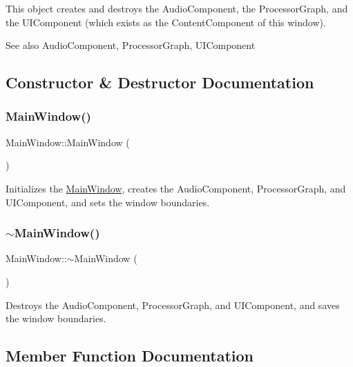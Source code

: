 This object creates and destroys the Audio\+Component, the Processor\+Graph, and the U\+I\+Component (which exists as the Content\+Component of this window).

\begin{DoxySeeAlso}{See also}
Audio\+Component, Processor\+Graph, U\+I\+Component 
\end{DoxySeeAlso}


\subsection{Constructor \& Destructor Documentation}
\mbox{\label{class_main_window_a34c4b4207b46d11a4100c9b19f0e81bb}} 
\subsubsection{\texorpdfstring{Main\+Window()}{MainWindow()}}
{\footnotesize\ttfamily Main\+Window\+::\+Main\+Window (\begin{DoxyParamCaption}{ }\end{DoxyParamCaption})}

Initializes the \mbox{\hyperlink{class_main_window}{Main\+Window}}, creates the Audio\+Component, Processor\+Graph, and U\+I\+Component, and sets the window boundaries. \mbox{\label{class_main_window_ae98d00a93bc118200eeef9f9bba1dba7}} 
\subsubsection{\texorpdfstring{$\sim$\+Main\+Window()}{~MainWindow()}}
{\footnotesize\ttfamily Main\+Window\+::$\sim$\+Main\+Window (\begin{DoxyParamCaption}{ }\end{DoxyParamCaption})}

Destroys the Audio\+Component, Processor\+Graph, and U\+I\+Component, and saves the window boundaries. 

\subsection{Member Function Documentation}
\mbox{\label{class_main_window_ac422fd3f1931a97b30d5efc8b6fc3123}} 
